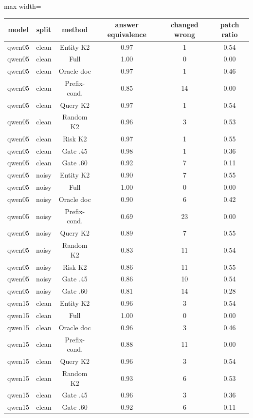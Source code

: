 \begin{table}[t]
\centering
\footnotesize
\begin{adjustbox}{max width=\textwidth}
\begin{tabular}{cccccc}
\toprule
model & split & method & answer equivalence & changed wrong & patch ratio \\
\midrule
qwen05 & clean & Entity K2 & 0.97 & 1 & 0.54 \\
qwen05 & clean & Full & 1.00 & 0 & 0.00 \\
qwen05 & clean & Oracle doc & 0.97 & 1 & 0.46 \\
qwen05 & clean & Prefix-cond. & 0.85 & 14 & 0.00 \\
qwen05 & clean & Query K2 & 0.97 & 1 & 0.54 \\
qwen05 & clean & Random K2 & 0.96 & 3 & 0.53 \\
qwen05 & clean & Risk K2 & 0.97 & 1 & 0.55 \\
qwen05 & clean & Gate .45 & 0.98 & 1 & 0.36 \\
qwen05 & clean & Gate .60 & 0.92 & 7 & 0.11 \\
qwen05 & noisy & Entity K2 & 0.90 & 7 & 0.55 \\
qwen05 & noisy & Full & 1.00 & 0 & 0.00 \\
qwen05 & noisy & Oracle doc & 0.90 & 6 & 0.42 \\
qwen05 & noisy & Prefix-cond. & 0.69 & 23 & 0.00 \\
qwen05 & noisy & Query K2 & 0.89 & 7 & 0.55 \\
qwen05 & noisy & Random K2 & 0.83 & 11 & 0.54 \\
qwen05 & noisy & Risk K2 & 0.86 & 11 & 0.55 \\
qwen05 & noisy & Gate .45 & 0.86 & 10 & 0.54 \\
qwen05 & noisy & Gate .60 & 0.81 & 14 & 0.28 \\
qwen15 & clean & Entity K2 & 0.96 & 3 & 0.54 \\
qwen15 & clean & Full & 1.00 & 0 & 0.00 \\
qwen15 & clean & Oracle doc & 0.96 & 3 & 0.46 \\
qwen15 & clean & Prefix-cond. & 0.88 & 11 & 0.00 \\
qwen15 & clean & Query K2 & 0.96 & 3 & 0.54 \\
qwen15 & clean & Random K2 & 0.93 & 6 & 0.53 \\
qwen15 & clean & Gate .45 & 0.96 & 3 & 0.36 \\
qwen15 & clean & Gate .60 & 0.92 & 6 & 0.11 \\

\end{tabular}
\end{adjustbox}
\end{table}
